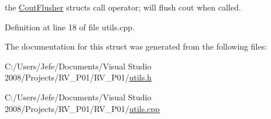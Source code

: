 the \hyperlink{structapp_1_1_cout_flusher}{Cout\+Flusher} structs call operator; will flush cout when called. 



Definition at line 18 of file utils.\+cpp.



The documentation for this struct was generated from the following files\+:\begin{DoxyCompactItemize}
\item 
C\+:/\+Users/\+Jefe/\+Documents/\+Visual Studio 2008/\+Projects/\+R\+V\+\_\+\+P01/\+R\+V\+\_\+\+P01/\hyperlink{utils_8h}{utils.\+h}\item 
C\+:/\+Users/\+Jefe/\+Documents/\+Visual Studio 2008/\+Projects/\+R\+V\+\_\+\+P01/\+R\+V\+\_\+\+P01/\hyperlink{utils_8cpp}{utils.\+cpp}\end{DoxyCompactItemize}
